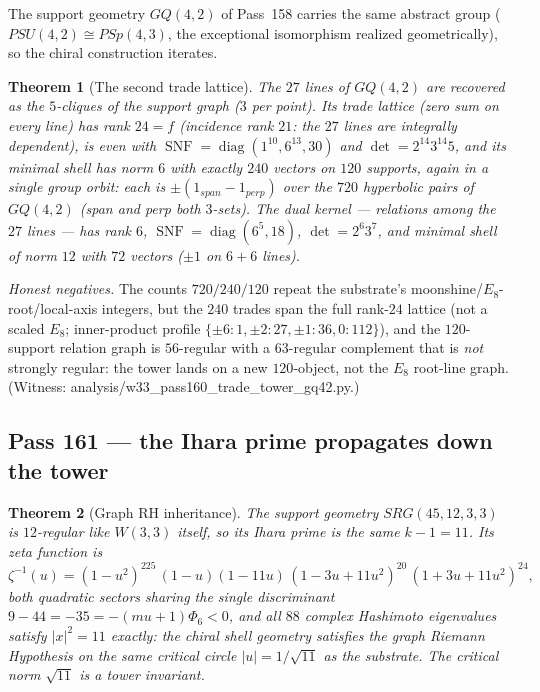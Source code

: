\documentclass[12pt,a4paper]{article}
\def\mathrm#1{#1}%
\def\mathbf#1{#1}%
\def\texttt#1{#1}%
\def\mu{mu}%
\def\Phi#1{Phi#1}%
\newtheorem{theorem}{Theorem}[section]
\theoremstyle{definition}
\newcommand{\SRG}{\mathrm{SRG}}
\newcommand{\GQ}{\mathrm{GQ}}
\newcommand{\PSp}{\mathrm{PSp}}
\begin{document}
The support geometry $\GQ(4,2)$ of Pass~158 carries the same abstract group
($\mathrm{PSU}(4,2)\cong\PSp(4,3)$, the exceptional isomorphism realized
geometrically), so the chiral construction iterates.

\begin{theorem}[The second trade lattice]
\label{thm:second-trade}
The $27$ lines of $\GQ(4,2)$ are recovered as the $5$-cliques of the
support graph ($3$ per point). Its trade lattice (zero sum on every line)
has rank $24=f$ (incidence rank $21$: the $27$ lines are integrally
dependent), is even with
$\operatorname{SNF}=\operatorname{diag}(1^{10},6^{13},30)$ and
$\det=2^{14}3^{14}5$, and its minimal shell has norm $6$ with exactly
$240$ vectors on $120$ supports, again in a single group orbit: each is
$\pm(\mathbf 1_{\mathrm{span}}-\mathbf 1_{\mathrm{perp}})$ over the $720$
hyperbolic pairs of $\GQ(4,2)$ (span and perp both $3$-sets). The dual
kernel --- relations among the $27$ lines --- has rank $6$,
$\operatorname{SNF}=\operatorname{diag}(6^{5},18)$, $\det=2^{6}3^{7}$, and
minimal shell of norm $12$ with $72$ vectors ($\pm1$ on $6{+}6$ lines).
\end{theorem}

\noindent\emph{Honest negatives.} The counts $720/240/120$ repeat the
substrate's moonshine/$E_8$-root/local-axis integers, but the $240$ trades
span the full rank-$24$ lattice (not a scaled $E_8$; inner-product profile
$\{\pm6{:}1,\pm2{:}27,\pm1{:}36,0{:}112\}$), and the $120$-support relation
graph is $56$-regular with a $63$-regular complement that is \emph{not}
strongly regular: the tower lands on a new $120$-object, not the $E_8$
root-line graph. (Witness:
\texttt{analysis/w33\_pass160\_trade\_tower\_gq42.py}.)

\subsection{Pass 161 --- the Ihara prime propagates down the tower}
\label{ssec:pass161}

\begin{theorem}[Graph RH inheritance]
\label{thm:ihara-inheritance}
The support geometry $\SRG(45,12,3,3)$ is $12$-regular like $W(3,3)$
itself, so its Ihara prime is the same $k-1=11$. Its zeta function is
\[
  \zeta^{-1}(u)=(1-u^2)^{225}\,(1-u)(1-11u)\,
  (1-3u+11u^2)^{20}\,(1+3u+11u^2)^{24},
\]
both quadratic sectors sharing the single discriminant
$9-44=-35=-(\mu{+}1)\Phi_6<0$, and all $88$ complex Hashimoto eigenvalues
satisfy $|x|^2=11$ exactly: the chiral shell geometry satisfies the graph
Riemann Hypothesis on the \emph{same} critical circle $|u|=1/\sqrt{11}$ as
the substrate. The critical norm $\sqrt{11}$ is a tower invariant.
\end{theorem}
\end{document}
